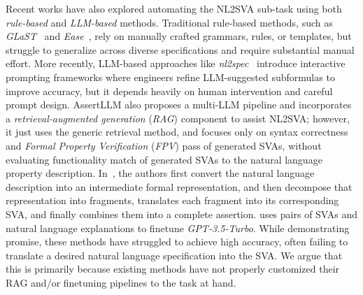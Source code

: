 Recent works have also explored automating the NL2SVA sub-task using both \textit{rule-based} and \textit{LLM-based} methods. Traditional rule-based methods, such as \textit{GLaST}~\cite{Harris16} and \textit{Ease}~\cite{Krishnamurthy19}, rely on manually crafted grammars, rules, or templates, but struggle to generalize across diverse specifications and require substantial manual effort. 
More recently, LLM-based approaches like \textit{nl2spec}~\cite{Cosler23} introduce interactive prompting frameworks where engineers refine LLM-suggested subformulas to improve accuracy, but it depends heavily on human intervention and careful prompt design. 
AssertLLM also proposes a multi-LLM pipeline and incorporates a \textit{retrieval-augmented generation} (\textit{RAG}) component to assist NL2SVA; 
however, it just uses the generic retrieval method, and focuses only on syntax correctness and \textit{Formal Property Verification} (\textit{FPV}) pass of generated SVAs, without evaluating functionality match of generated SVAs to the natural language property description.
In~\cite{wu2025}, the authors first convert the natural language description into an intermediate formal representation, and then decompose that representation into fragments, translates each fragment into its corresponding SVA, and finally combines them into a complete assertion.
\cite{Shahidzadeh24} uses pairs of SVAs and natural language explanations to finetune \textit{GPT-3.5-Turbo}.
While demonstrating promise, these methods have struggled to achieve high accuracy, often failing to translate a desired natural language specification into the SVA. We argue that this is primarily because existing methods have not properly customized their RAG and/or finetuning pipelines to the task at hand.

